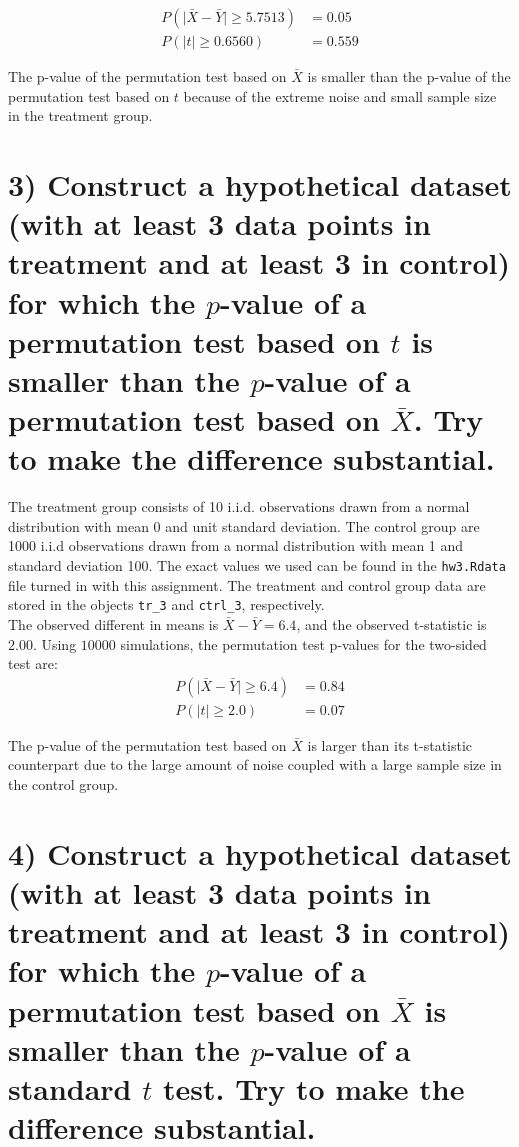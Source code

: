 \documentclass[11pt]{article}
\newcommand{\pr}{P} %
\begin{document}
\begin{align*}
\pr(\lvert \bar{X} - \bar{Y} \rvert \geq 5.7513) &= 0.05 \\
\pr(\lvert t\rvert \geq 0.6560) &= 0.559
\end{align*}

The p-value of the permutation test based on $\bar{X}$ is smaller than the p-value of the permutation test based on $t$ because of the extreme noise and small sample size in the treatment group.  

\section*{3) Construct a hypothetical dataset (with at least 3 data points in treatment and at least 3 in control) for which the $p$-value of a permutation test based on $t$ is smaller than the $p$-value of a permutation test based on $\bar{X}$. Try to make the difference substantial.}

The treatment group consists of 10 i.i.d. observations drawn from a normal distribution with mean 0 and unit standard deviation.  The control group are 1000 i.i.d observations drawn from a normal distribution with mean 1 and standard deviation 100.  The exact values we used can be found in the \texttt{hw3.Rdata} file turned in with this assignment.  The treatment and control group data are stored in the objects \texttt{tr\_3} and \texttt{ctrl\_3}, respectively. \\

The observed different in means is $\bar{X} - \bar{Y} = 6.4$, and the observed t-statistic is $2.00$.  Using $10000$ simulations, the permutation test p-values for the two-sided test are:
\begin{align*}
\pr(\lvert \bar{X} - \bar{Y} \rvert \geq 6.4) &= 0.84 \\
\pr(\lvert t\rvert \geq 2.0) &= 0.07
\end{align*}

The p-value of the permutation test based on $ \bar{X} $ is larger than its t-statistic counterpart due to the large amount of noise coupled with a large sample size in the control group.

\section*{4) Construct a hypothetical dataset (with at least 3 data points in treatment and at least 3 in control) for which the $p$-value of a permutation test based on $\bar{X}$ is smaller than the $p$-value of a standard $t$ test. Try to make the difference substantial.}
\end{document}
